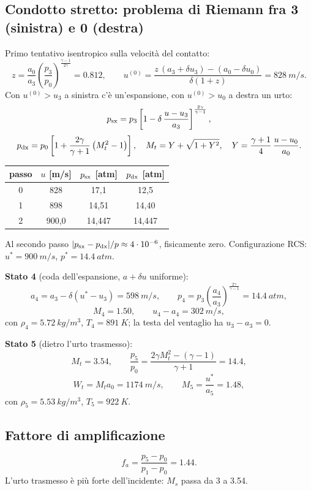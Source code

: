 \documentclass[11pt,a4paper]{article}
\newcommand{\fa}{f_a}
\begin{document}
\subsection{Condotto stretto: problema di Riemann fra 3 (sinistra) e 0 (destra)}
Primo tentativo isentropico sulla velocità del contatto:
\[
  z=\frac{a_0}{a_3}\left(\frac{p_3}{p_0}\right)^{\frac{\gamma-1}{2\gamma}}=\num{0.812},\qquad
  u^{(0)}=\frac{z\,(a_3+\delta u_3)-(a_0-\delta u_0)}{\delta(1+z)}=\SI{828}{m/s}.
\]
Con $u^{(0)}>u_3$ a sinistra c'è un'espansione, con $u^{(0)}>u_0$ a destra un urto:
\[
  p_{\rm sx}=p_3\left[1-\delta\,\frac{u-u_3}{a_3}\right]^{\frac{2\gamma}{\gamma-1}},
\]
\[
  p_{\rm dx}=p_0\left[1+\frac{2\gamma}{\gamma+1}\left(M_t^2-1\right)\right],\quad
  M_t=Y+\sqrt{1+Y^2},\quad Y=\frac{\gamma+1}{4}\,\frac{u-u_0}{a_0}.
\]
\begin{table}[H]
  \centering
  \begin{tabular}{cccc}
    \toprule
    passo & $u$ [m/s] & $p_{\rm sx}$ [atm] & $p_{\rm dx}$ [atm] \\
    \midrule
    0 & 828 & 17,1 & 12,5 \\
    1 & 898 & 14,51 & 14,40 \\
    2 & 900,0 & 14,447 & 14,447 \\
    \bottomrule
  \end{tabular}
\end{table}
Al secondo passo $|p_{\rm sx}-p_{\rm dx}|/p\approx4\cdot10^{-6}$, fisicamente zero. Configurazione RCS:
$u^*=\SI{900}{m/s}$, $p^*=\SI{14.4}{atm}$.

\textbf{Stato 4} (coda dell'espansione, $a+\delta u$ uniforme):
\[
  a_4=a_3-\delta\left(u^*-u_3\right)=\SI{598}{m/s},\qquad
  p_4=p_3\left(\frac{a_4}{a_3}\right)^{\frac{2\gamma}{\gamma-1}}=\SI{14.4}{atm},
\]
\[
  M_4=\num{1.50},\qquad u_4-a_4=\SI{302}{m/s},
\]
con $\rho_4=\SI{5.72}{kg/m^3}$, $T_4=\SI{891}{K}$; la testa del ventaglio ha $u_3-a_3=0$.

\textbf{Stato 5} (dietro l'urto trasmesso):
\[
  M_t=\num{3.54},\qquad \frac{p_5}{p_0}=\frac{2\gamma M_t^2-(\gamma-1)}{\gamma+1}=\num{14.4},
\]
\[
  W_t=M_ta_0=\SI{1174}{m/s},\qquad M_5=\frac{u^*}{a_5}=\num{1.48},
\]
con $\rho_5=\SI{5.53}{kg/m^3}$, $T_5=\SI{922}{K}$.

\subsection{Fattore di amplificazione}
\[
  \fa=\frac{p_5-p_0}{p_1-p_0}=\num{1.44}.
\]
L'urto trasmesso è più forte dell'incidente: $M_s$ passa da 3 a \num{3.54}.
\end{document}
